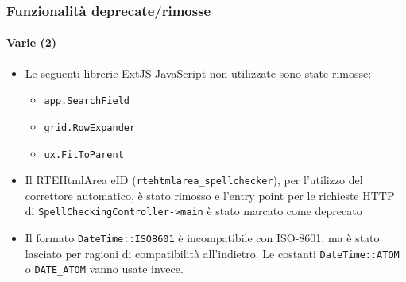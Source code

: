 \begin{frame}[fragile]
	\frametitle{Funzionalità deprecate/rimosse}
	\framesubtitle{Varie (2)}

	\begin{itemize}

		\item Le seguenti librerie ExtJS JavaScript non utilizzate sono state rimosse:

			\begin{itemize}
				\item \texttt{app.SearchField}
				\item \texttt{grid.RowExpander}
				\item \texttt{ux.FitToParent}
			\end{itemize}

		\item Il RTEHtmlArea eID (\texttt{rtehtmlarea\_spellchecker}), per l'utilizzo
			del correttore automatico, è stato rimosso e l'entry point per le richieste HTTP di
			\texttt{SpellCheckingController->main} è stato marcato come deprecato

		\item Il formato \texttt{DateTime::ISO8601} è incompatibile con ISO-8601,
			ma è stato lasciato per ragioni di compatibilità all'indietro.
			Le costanti \texttt{DateTime::ATOM} o \texttt{DATE\_ATOM} vanno usate invece.

	\end{itemize}

\end{frame}


